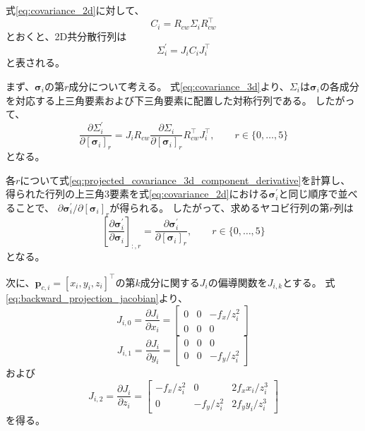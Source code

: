 \documentclass[dvipdfmx]{jlreq}
\begin{document}
式\eqref{eq:covariance_2d}に対して、
\begin{equation}
    C_i=R_{cw}\Sigma_iR_{cw}^{\top}
    \label{eq:camera_covariance_definition}
\end{equation}
とおくと、2D共分散行列は
\begin{equation}
    \Sigma_i^{\prime}=J_iC_iJ_i^{\top}
    \label{eq:backward_2d_covariance}
\end{equation}
と表される。

まず、$\bm{\sigma}_i$の第$r$成分について考える。
式\eqref{eq:covariance_3d}より、$\Sigma_i$は$\bm{\sigma}_i$の各成分を対応する上三角要素および下三角要素に配置した対称行列である。
したがって、
\begin{equation}
    \frac{\partial\Sigma_i^{\prime}}{\partial[\bm{\sigma}_i]_r} = J_iR_{cw} \frac{\partial\Sigma_i}{\partial[\bm{\sigma}_i]_r} R_{cw}^{\top}J_i^{\top}, \qquad r\in\{0,\ldots,5\}
    \label{eq:projected_covariance_3d_component_derivative}
\end{equation}
となる。

各$r$について式\eqref{eq:projected_covariance_3d_component_derivative}を計算し、
得られた行列の上三角3要素を式\eqref{eq:covariance_2d}における$\bm{\sigma}_i^{\prime}$と同じ順序で並べることで、
$\partial\bm{\sigma}_i^{\prime}/\partial[\bm{\sigma}_i]_r$が得られる。
したがって、求めるヤコビ行列の第$r$列は
\begin{equation}
    \left[\frac{\partial\bm{\sigma}_i^{\prime}}{\partial\bm{\sigma}_i}\right]_{:,r} = \frac{\partial\bm{\sigma}_i^{\prime}}{\partial[\bm{\sigma}_i]_r}, \qquad r\in\{0,\ldots,5\}
    \label{eq:projected_covariance_3d_jacobian}
\end{equation}
となる。

次に、$\bm{p}_{c,i}=[x_i,y_i,z_i]^{\top}$の第$k$成分に関する$J_i$の偏導関数を$J_{i,k}$とする。
式\eqref{eq:backward_projection_jacobian}より、
\begin{equation}
    J_{i,0} =\frac{\partial J_i}{\partial x_i} =
    \begin{bmatrix}
        0 & 0 & -f_x/z_i^2 \\
        0 & 0 & 0
    \end{bmatrix}
    \label{eq:projection_jacobian_x_derivative}
\end{equation}
\begin{equation}
    J_{i,1} =\frac{\partial J_i}{\partial y_i} =
    \begin{bmatrix}
        0 & 0 & 0 \\
        0 & 0 & -f_y/z_i^2
    \end{bmatrix}
    \label{eq:projection_jacobian_y_derivative}
\end{equation}
および
\begin{equation}
    J_{i,2} =\frac{\partial J_i}{\partial z_i} =
    \begin{bmatrix}
        -f_x/z_i^2 & 0 & 2f_xx_i/z_i^3 \\
        0 & -f_y/z_i^2 & 2f_yy_i/z_i^3
    \end{bmatrix}
    \label{eq:projection_jacobian_z_derivative}
\end{equation}
を得る。
\end{document}
